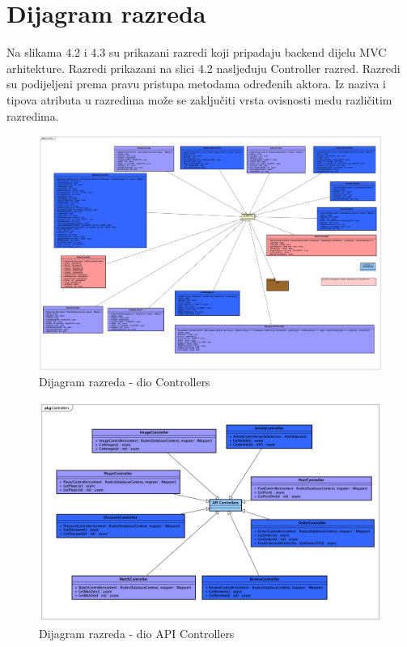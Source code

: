 			\eject
			
			
		\section{Dijagram razreda}
		
			\textnormal{Na slikama 4.2 i 4.3 su prikazani razredi koji pripadaju backend dijelu MVC arhitekture. Razredi prikazani na slici 4.2 nasljeđuju Controller razred. Razredi su podijeljeni prema pravu pristupa metodama određenih aktora. Iz naziva i tipova atributa u razredima može se zaključiti vrsta ovisnosti medu različitim razredima.}\\
			
			\begin{figure}[H]
				\includegraphics[width=\linewidth]{dijagrami/DijagramRazredaController.png}
				\centering
				\caption{Dijagram razreda - dio Controllers}
				\label{fig:ClassDiagram1}
			\end{figure}
		\begin{figure}[H]
			\includegraphics[width=\linewidth]{dijagrami/APIcontrollers.png}
			\centering
			\caption{Dijagram razreda - dio API Controllers}
			\label{fig:ClassDiagram1}
		\end{figure}
		
